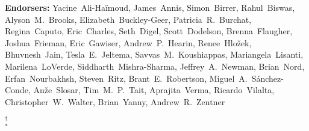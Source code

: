 \begin{raggedright}
\textbf{Endorsers:}
Yacine~Ali-Ha\"imoud,
James~Annis,
Simon~Birrer,
Rahul~Biswas,
Alyson~M.~Brooks,
Elizabeth~Buckley-Geer,
Patricia~R.~Burchat,
Regina~Caputo,
Eric~Charles,
Seth~Digel,
Scott~Dodelson,
Brenna~Flaugher,
Joshua~Frieman,
Eric~Gawiser,
Andrew~P.~Hearin,
Renee~Hlo\v{z}ek,
Bhuvnesh~Jain,
Tesla~E.~Jeltema,
Savvas~M.~Koushiappas,
Mariangela~Lisanti,
Marilena~LoVerde,
Siddharth~Mishra-Sharma,
Jeffrey~A.~Newman,
Brian~Nord,
Erfan~Nourbakhsh,
Steven~Ritz,
Brant~E.~Robertson,
Miguel~A.~S\'anchez-Conde,
An\v{z}e~Slosar,
Tim~M.~P.~Tait,
Aprajita~Verma,
Ricardo~Vilalta,
Christopher~W.~Walter,
Brian~Yanny,
Andrew~R.~Zentner


$^\dagger$  \\
$^*$ 

\clearpage
\begin{multicols}{2}
\scriptsize
\parskip=4pt


\end{multicols}
\end{raggedright}
